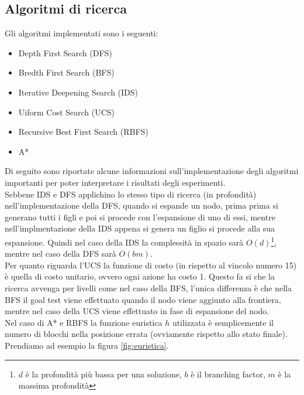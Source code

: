 \documentclass{article}
\begin{document}
	\subsection{Algoritmi di ricerca}
	Gli algoritmi implementati sono i seguenti:
	\begin{itemize}
		\item Depth First Search (DFS)
		\item Bredth First Search (BFS)
		\item Iterative Deepening Search (IDS)
		\item Uiform Cost Search (UCS)
		\item Recursive Best First Search (RBFS)
		\item A*
	\end{itemize}
	Di seguito sono riportate alcune informazioni sull'implementazione degli algoritmi importanti per poter interpretare i risultati degli esperimenti.\\Sebbene IDS e DFS applichino lo stesso tipo di ricerca (in profondità) nell'implementazione della DFS, quando si espande un nodo, prima prima si generano tutti i figli e poi si procede con l'espansione di uno di essi, mentre nell'implmentazione della IDS appena si genera un figlio si procede alla sua espansione. Quindi nel caso della IDS la complessità in spazio sarà $O(d)$\footnote{$d$ è la profondità più bassa per una soluzione, $b$ è il branching factor, $m$ è la massima profondità}, mentre nel caso della DFS sarà $O(bm)$.\\
	Per quanto riguarda l'UCS la funzione di costo (in rispetto al vincolo numero 15) è quella di costo unitario, ovvero ogni azione ha costo 1. Questo fa si che la ricerca avvenga per livelli come nel caso della BFS, l'unica differenza è che nella BFS il goal test viene effettuato quando il nodo viene aggiunto alla frontiera, mentre nel caso della UCS viene effettuato in fase di espansione del nodo.\\
	Nel caso di A* e RBFS la funzione euristica $h$ utilizzata è semplicemente il numero di blocchi nella posizione errata (ovviamente rispetto allo stato finale). Prendiamo ad esempio la figura \ref{fig:euristica}.
\end{document}

